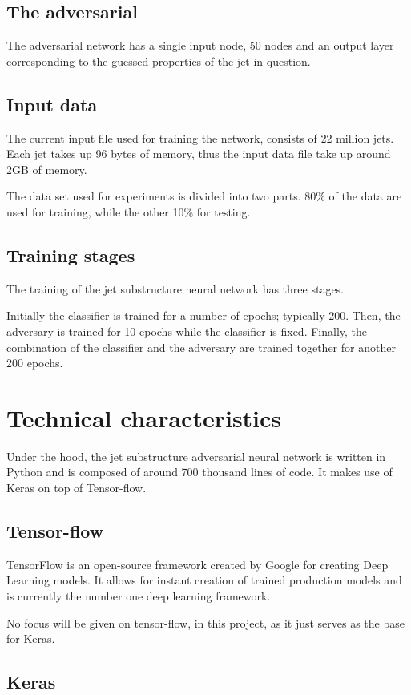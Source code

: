 \subsection{The adversarial}
The adversarial network has a single input node, 50 nodes and an output layer corresponding to the guessed properties of the jet in question.

\subsection{Input data}
The current input file used for training the network, consists of 22 million jets. Each jet takes up 96 bytes of memory, thus the input data file take up around 2GB of memory.

The data set used for experiments is divided into two parts. 80\% of the data are used for training, while the other 10\% for testing. 

\subsection{Training stages}
The training of the jet substructure neural network has three stages. 

Initially the classifier is trained for a number of epochs; typically 200. Then, the adversary is trained for 10 epochs while the classifier is fixed. Finally, the combination of the classifier and the adversary are trained together for another 200 epochs.


\section{Technical characteristics}
Under the hood, the jet substructure adversarial neural network is written in Python and is composed of around 700 thousand lines of code. It makes use of Keras on top of Tensor-flow. 

\subsection{Tensor-flow}
TensorFlow is an open-source framework created by Google for creating Deep Learning models. It allows for instant creation of trained production models and is currently the number one deep learning framework.

No focus will be given on tensor-flow, in this project, as it just serves as the base for Keras.

\subsection{Keras}

